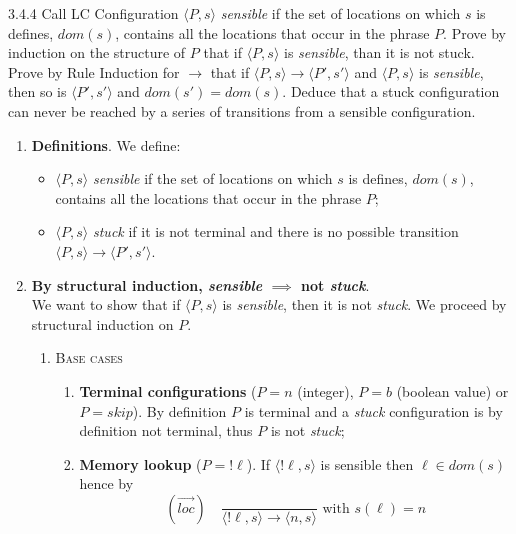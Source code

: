 \begin{exercise}{3.4.4}
Call {\sffamily LC} Configuration $\langle P,s \rangle$ \textit{sensible} if the set of locations on which $s$ is defines, $dom(s)$, contains all the locations that occur in the phrase $P$. Prove by induction on the structure of $P$ that if $\langle P,s \rangle$ is \textit{sensible}, than it is not stuck. Prove by Rule Induction for $\rightarrow$ that if $\langle P,s \rangle \rightarrow \langle P',s' \rangle$ and $\langle P,s \rangle$ is \textit{sensible}, then so is $\langle P',s' \rangle$ and $dom(s') = dom(s)$. Deduce that a stuck configuration can never be reached by a series of transitions from a sensible configuration.

\end{exercise}

\begin{solution}
\begin{enumerate}
    \item \textbf{Definitions}. We define:
    \begin{itemize}
        \item $\langle P,s \rangle$ \textit{sensible} if the set of locations on which $s$ is defines, $dom(s)$, contains all the locations that occur in the phrase $P$;
        \item $\langle P,s \rangle$ \textit{stuck} if it is not terminal and there is no possible transition $\langle P,s \rangle \rightarrow \langle P',s' \rangle$.
    \end{itemize}
    \item \textbf{By structural induction, \textit{sensible} $\implies$ not \textit{stuck}}. \\
    We want to show that if $\langle P,s \rangle$ is \textit{sensible}, then it is not \textit{stuck}. We proceed by structural induction on $P$.
    \begin{enumerate}
        \item \textsc{Base cases} 
        \begin{enumerate}
            \item \textbf{Terminal configurations} ($P=n$ (integer), $P=b$ (boolean value) or $P=skip$). By definition $P$ is terminal and a \textit{stuck} configuration is by definition not terminal, thus $P$ is not \textit{stuck};
            \item \textbf{Memory lookup} ($P=!\ell $). If $\langle !\ell, s\rangle$ is sensible then $\ell \in dom(s)$ hence by 
            \[(\overset{\rightarrow}{loc} ) \quad \frac{}{\langle !\ell ,s \rangle \to \langle n,s\rangle} \text{ with }  s(\ell) = n\]

\end{enumerate}
\end{enumerate}
\end{enumerate}
\end{solution}
